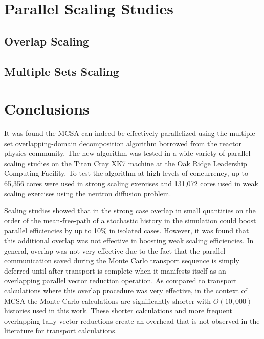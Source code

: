 \documentclass{snamc2013}
\begin{document}
\section{Parallel Scaling Studies}

\subsection{Overlap Scaling}

\subsection{Multiple Sets Scaling}

\section{Conclusions}

It was found the MCSA can indeed be effectively parallelized using the
multiple-set overlapping-domain decomposition algorithm borrowed from
the reactor physics community.  The new algorithm was tested in a wide
variety of parallel scaling studies on the Titan Cray XK7 machine at
the Oak Ridge Leadership Computing Facility. To test the algorithm at
high levels of concurrency, up to 65,356 cores were used in strong
scaling exercises and 131,072 cores used in weak scaling exercises
using the neutron diffusion problem.

Scaling studies showed that in the strong case overlap in small
quantities on the order of the mean-free-path of a stochastic history
in the simulation could boost parallel efficiencies by up to 10\% in
isolated cases. However, it was found that this additional overlap was
not effective in boosting weak scaling efficiencies. In general,
overlap was not very effective due to the fact that the parallel
communication saved during the Monte Carlo transport sequence is
simply deferred until after transport is complete when it manifests
itself as an overlapping parallel vector reduction operation. As
compared to transport calculations where this overlap procedure was
very effective, in the context of MCSA the Monte Carlo calculations
are significantly shorter with $O(10,000)$ histories used in this
work. These shorter calculations and more frequent overlapping tally
vector reductions create an overhead that is not observed in the
literature for transport calculations.
\end{document}
